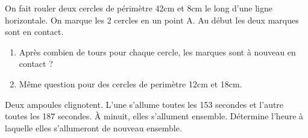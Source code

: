 \documentclass[main.tex]{subfiles}
\begin{document}
 \begin{exercise} \hfill 
 	
 	\begin{figure}[h]
 \end{figure}
 On fait rouler deux cercles de périmètre 42\si{\centi\meter} et 8\si{\centi\meter} le long d'une ligne horizontale. On marque les 2 cercles en un point A. Au début les deux marques sont en contact.
 \begin{enumerate}[label={\alph*)},    leftmargin=*] 
 	\item Après combien de tours pour chaque cercle, les marques sont à nouveau en contact ?
 	\item Même question pour des cercles de perimètre 12\si{\centi\meter} et 18\si{\centi\meter}.
 \end{enumerate}
\end{exercise}
\begin{exercise}\hfill 

Deux ampoules clignotent. L’une s’allume toutes les 153 secondes et l’autre toutes les
187 secondes. À minuit, elles s’allument ensemble.
Détermine l’heure à laquelle elles s’allumeront de nouveau ensemble.
\end{exercise} 
%	 

\newpage 
{}  
\pagestyle{scrheadings} %
\onehalfspacing 
\end{document}
